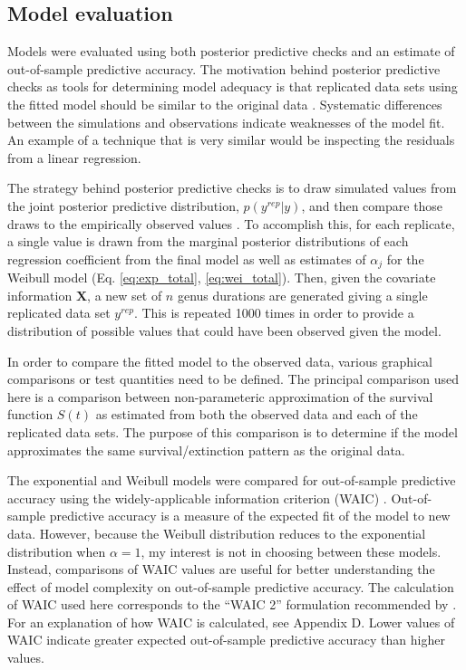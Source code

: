 \documentclass{article}
\begin{document}
\subsection{Model evaluation}

Models were evaluated using both posterior predictive checks and an estimate of out-of-sample predictive accuracy. The motivation behind posterior predictive checks as tools for determining model adequacy is that replicated data sets using the fitted model should be similar to the original data \citep{Gelman2013d}. Systematic differences between the simulations and observations indicate weaknesses of the model fit. An example of a technique that is very similar would be inspecting the residuals from a linear regression.

The strategy behind posterior predictive checks is to draw simulated values from the joint posterior predictive distribution, \(p(y^{rep} | y)\), and then compare those draws to the empirically observed values \citep{Gelman2013d}. To accomplish this, for each replicate, a single value is drawn from the marginal posterior distributions of each regression coefficient from the final model as well as estimates of \(\alpha_{j}\) for the Weibull model (Eq. \ref{eq:exp_total}, \ref{eq:wei_total}). Then, given the covariate information \(\mathbf{X}\), a new set of \(n\) genus durations are generated giving a single replicated data set \(y^{rep}\). This is repeated 1000 times in order to provide a distribution of possible values that could have been observed given the model. 

In order to compare the fitted model to the observed data, various graphical comparisons or test quantities need to be defined. The principal comparison used here is a comparison between non-parameteric approximation of the survival function \(S(t)\) as estimated from both the observed data and each of the replicated data sets. The purpose of this comparison is to determine if the model approximates the same survival/extinction pattern as the original data. 

The exponential and Weibull models were compared for out-of-sample predictive accuracy using the widely-applicable information criterion (WAIC) \citep{Watanabe2010a}. Out-of-sample predictive accuracy is a measure of the expected fit of the model to new data. However, because the Weibull distribution reduces to the exponential distribution when \(\alpha = 1\), my interest is not in choosing between these models. Instead, comparisons of WAIC values are useful for better understanding the effect of model complexity on out-of-sample predictive accuracy. The calculation of WAIC used here corresponds to the ``WAIC 2'' formulation recommended by \citet{Gelman2013d}. For an explanation of how WAIC is calculated, see Appendix D. Lower values of WAIC indicate greater expected out-of-sample predictive accuracy than higher values.
\end{document}
